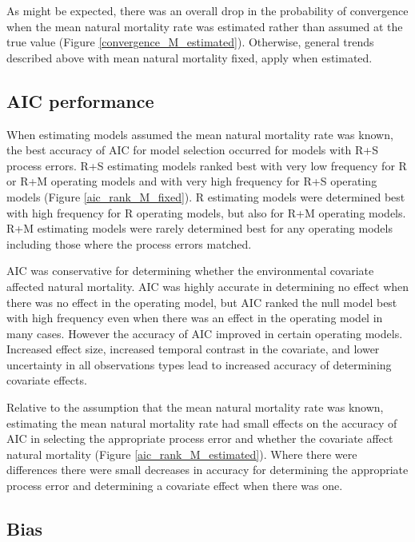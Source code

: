 \documentclass[
  12pt,
]{article}
\begin{document}
As might be expected, there was an overall drop in the probability of
convergence when the mean natural mortality rate was estimated rather
than assumed at the true value (Figure \ref{convergence_M_estimated}).
Otherwise, general trends described above with mean natural mortality
fixed, apply when estimated.

\hypertarget{aic-performance}{%
\subsection*{AIC performance}\label{aic-performance}}

When estimating models assumed the mean natural mortality rate was
known, the best accuracy of AIC for model selection occurred for models
with R+S process errors. R+S estimating models ranked best with very low
frequency for R or R+M operating models and with very high frequency for
R+S operating models (Figure \ref{aic_rank_M_fixed}). R estimating
models were determined best with high frequency for R operating models,
but also for R+M operating models. R+M estimating models were rarely
determined best for any operating models including those where the
process errors matched.

AIC was conservative for determining whether the environmental covariate
affected natural mortality. AIC was highly accurate in determining no
effect when there was no effect in the operating model, but AIC ranked
the null model best with high frequency even when there was an effect in
the operating model in many cases. However the accuracy of AIC improved
in certain operating models. Increased effect size, increased temporal
contrast in the covariate, and lower uncertainty in all observations
types lead to increased accuracy of determining covariate effects.

Relative to the assumption that the mean natural mortality rate was
known, estimating the mean natural mortality rate had small effects on
the accuracy of AIC in selecting the appropriate process error and
whether the covariate affect natural mortality (Figure
\ref{aic_rank_M_estimated}). Where there were differences there were
small decreases in accuracy for determining the appropriate process
error and determining a covariate effect when there was one.

\hypertarget{bias-1}{%
\subsection*{Bias}\label{bias-1}}
\end{document}
